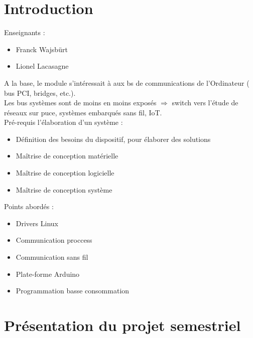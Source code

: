 \section{Introduction}
Enseignants :
\begin{itemize}
  \item Franck Wajsbürt
  \item Lionel Lacasagne
\end{itemize}

A la base, le module s'intéressait à aux bs de communications de l'Ordinateur (
bus PCI, bridges, etc.).\\
Les bus systèmes sont de moins en moins exposés $\Rightarrow$ switch vers l'étude
de réseaux sur puce, systèmes embarqués sans fil, IoT.\\

Pré-requis l'élaboration d'un système :
\begin{itemize}
  \item Définition des besoins du dispositif, pour élaborer des solutions
  \item Maîtrise de conception matérielle
  \item Maîtrise de conception logicielle
  \item Maîtrise de conception système
\end{itemize}

Points abordés :
\begin{itemize}
  \item Drivers Linux
  \item Communication proccess
  \item Communication sans fil
  \item Plate-forme Arduino
  \item Programmation basse consommation
\end{itemize}

\section{Présentation du projet semestriel}

